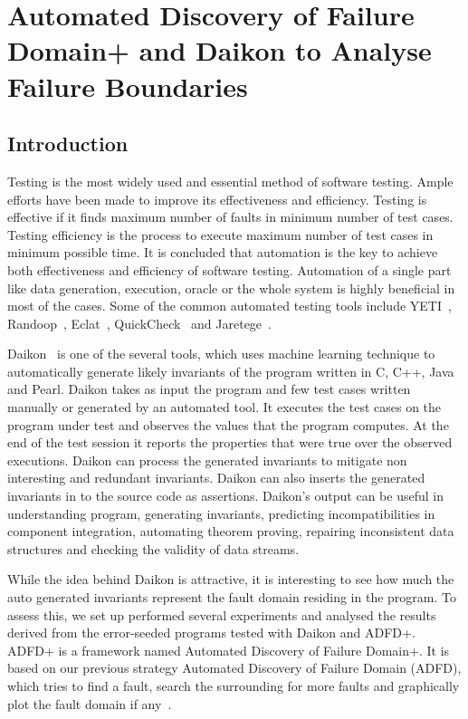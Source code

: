 \chapter{Automated Discovery of Failure Domain+ and Daikon to Analyse Failure Boundaries}
\label{chap:ADFD+}



\section{Introduction}\label{sec:intro}
Testing is the most widely used and essential method of software testing. Ample efforts have been made to improve its effectiveness and efficiency. Testing is effective if it finds maximum number of faults in minimum number of test cases. Testing efficiency is the process to execute maximum number of test cases in minimum possible time. It is concluded that automation is the key to achieve both effectiveness and efficiency of software testing. Automation of a single part like data generation, execution, oracle or the whole system is highly beneficial in most of the cases. Some of the common automated testing tools include YETI~\cite{Oriol2011yeti}, Randoop~\cite{pacheco2007randoop}, Eclat~\cite{pacheco2005eclat}, QuickCheck~\cite{claessen2011quickcheck} and Jaretege~\cite{oriat2005jartege}. 

Daikon~\cite{ernst2007daikon} is one of the several tools, which uses machine learning technique to automatically generate likely invariants of the program written in C, C++, Java and Pearl. Daikon takes as input the program and few test cases written manually or generated by an automated tool. It executes the test cases on the program under test and observes the values that the program computes. At the end of the test session it reports the properties that were true over the observed executions. Daikon can process the generated invariants to mitigate non interesting and redundant invariants. Daikon can also inserts the generated invariants in to the source code as assertions. Daikon's output can be useful in understanding program, generating invariants, predicting incompatibilities in component integration, automating theorem proving, repairing inconsistent data structures and checking the validity of data streams.

While the idea behind Daikon is attractive, it is interesting to see how much the auto generated invariants represent the fault domain residing in the program. To assess this, we set up performed several experiments and analysed the results derived from the error-seeded programs tested with Daikon and ADFD+. ADFD+ is a framework named Automated Discovery of Failure Domain+. It is based on our previous strategy Automated Discovery of Failure Domain (ADFD), which tries to find a fault, search the surrounding for more faults and graphically plot the fault domain if any~\cite{ahmad2013adfd}.  


